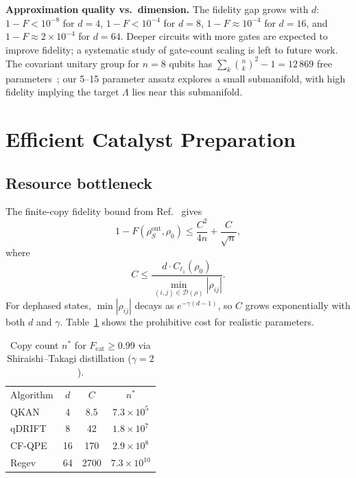 \documentclass[prx,twocolumn,superscriptaddress,longbibliography,floatfix]{revtex4-2}
\begin{document}
\textbf{Approximation quality vs.\ dimension.}
The fidelity gap grows with $d$: $1 - F < 10^{-8}$ for $d = 4$, $1 - F < 10^{-4}$ for $d = 8$, $1 - F \approx 10^{-4}$ for $d = 16$, and $1 - F \approx 2 \times 10^{-4}$ for $d = 64$.
Deeper circuits with more gates are expected to improve fidelity; a systematic study of gate-count scaling is left to future work.
The covariant unitary group for $n = 8$ qubits has $\sum_k \binom{n}{k}^2 - 1 = 12\,869$ free parameters~\cite{Schuch2004}; our 5--15 parameter ansatz explores a small submanifold, with high fidelity implying the target $\Lambda$ lies near this submanifold.


\section{Efficient Catalyst Preparation}
\label{sec:catalyst_prep}

\subsection{Resource bottleneck}
\label{sec:bottleneck}

The finite-copy fidelity bound from Ref.~\cite{Shiraishi2024} gives
\begin{equation}
1 - F(\rho_S^\mathrm{out}, \rho_0) \leq \frac{C^2}{4n} + \frac{C}{\sqrt{n}},
\label{eq:finite_n_fidelity}
\end{equation}
where
\begin{equation}
C \leq \frac{d \cdot C_{\ell_1}(\rho_0)}{\displaystyle\min_{(i,j) \in \mathcal{D}(\rho)} |\rho_{ij}|}.
\label{eq:C_bound}
\end{equation}
For dephased states, $\min|\rho_{ij}|$ decays as $e^{-\gamma(d-1)}$, so $C$ grows exponentially with both $d$ and $\gamma$.
Table~\ref{tab:bottleneck} shows the prohibitive cost for realistic parameters.

\begin{table}[tb]
\caption{Copy count $n^*$ for $F_\mathrm{cat} \geq 0.99$ via Shiraishi--Takagi distillation ($\gamma = 2$).}
\label{tab:bottleneck}
\begin{ruledtabular}
\begin{tabular}{lccc}
Algorithm & $d$ & $C$ & $n^*$ \\
\colrule
QKAN & 4 & 8.5 & $7.3 \times 10^5$ \\
qDRIFT & 8 & 42 & $1.8 \times 10^7$ \\
CF-QPE & 16 & 170 & $2.9 \times 10^8$ \\
Regev & 64 & 2700 & $7.3 \times 10^{10}$ \\
\end{tabular}
\end{ruledtabular}
\end{table}
\end{document}
